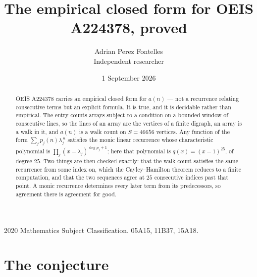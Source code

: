 \documentclass[11pt,a4paper]{article}
\title{The empirical closed form for OEIS A224378, proved}
\author{Adrian Perez Fontelles\\ \small Independent researcher}
\date{1 September 2026}
\theoremstyle{plain}
\theoremstyle{definition}
\begin{document}
\maketitle

\begin{abstract}
OEIS A224378 carries an empirical closed form for $a(n)$ --- not a recurrence relating
consecutive terms but an explicit formula. It is true, and it is decidable rather than
empirical. The entry counts arrays subject to a condition on a bounded window of consecutive lines, so the lines of an array are the
vertices of a finite digraph, an array is a walk in it, and $a(n)$ is a walk count on
$S=46656$ vertices. Any function of the form $\sum_j p_j(n)\lambda_j^{\,n}$ satisfies the
monic linear recurrence whose characteristic polynomial is
$\prod_j(x-\lambda_j)^{\deg p_j+1}$; here that polynomial is $q(x)=(x-1)^{25}$, of degree
$25$. Two things are then checked exactly: that the walk count satisfies the same
recurrence from some index on, which the Cayley--Hamilton theorem reduces to a finite
computation, and that the two sequences agree at $25$ consecutive indices past that
point. A monic recurrence determines every later term from its predecessors, so agreement
there is agreement for good.
\end{abstract}

\noindent\small 2020 Mathematics Subject Classification. 05A15, 11B37, 15A18.\normalsize

\section{The conjecture}
\end{document}

